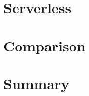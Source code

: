 \section{Serverless}\label{chp:suitSL}


\section{Comparison}\label{chp:suitComp}


\section{Summary}

